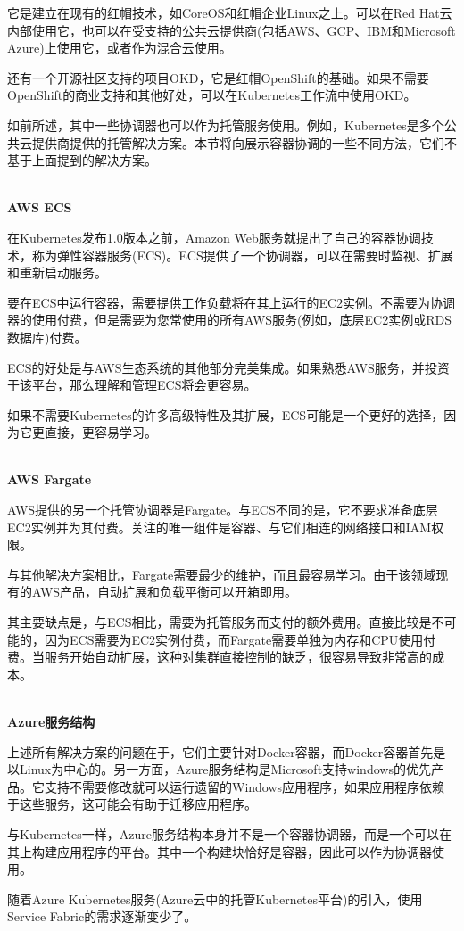 它是建立在现有的红帽技术，如CoreOS和红帽企业Linux之上。可以在Red Hat云内部使用它，也可以在受支持的公共云提供商(包括AWS、GCP、IBM和Microsoft Azure)上使用它，或者作为混合云使用。

还有一个开源社区支持的项目OKD，它是红帽OpenShift的基础。如果不需要OpenShift的商业支持和其他好处，可以在Kubernetes工作流中使用OKD。


如前所述，其中一些协调器也可以作为托管服务使用。例如，Kubernetes是多个公共云提供商提供的托管解决方案。本节将向展示容器协调的一些不同方法，它们不基于上面提到的解决方案。

\hspace*{\fill} \\ %
\noindent
\textbf{AWS ECS}

在Kubernetes发布1.0版本之前，Amazon Web服务就提出了自己的容器协调技术，称为弹性容器服务(ECS)。ECS提供了一个协调器，可以在需要时监视、扩展和重新启动服务。

要在ECS中运行容器，需要提供工作负载将在其上运行的EC2实例。不需要为协调器的使用付费，但是需要为您常使用的所有AWS服务(例如，底层EC2实例或RDS数据库)付费。

ECS的好处是与AWS生态系统的其他部分完美集成。如果熟悉AWS服务，并投资于该平台，那么理解和管理ECS将会更容易。

如果不需要Kubernetes的许多高级特性及其扩展，ECS可能是一个更好的选择，因为它更直接，更容易学习。

\hspace*{\fill} \\ %
\noindent
\textbf{AWS Fargate}

AWS提供的另一个托管协调器是Fargate。与ECS不同的是，它不要求准备底层EC2实例并为其付费。关注的唯一组件是容器、与它们相连的网络接口和IAM权限。

与其他解决方案相比，Fargate需要最少的维护，而且最容易学习。由于该领域现有的AWS产品，自动扩展和负载平衡可以开箱即用。

其主要缺点是，与ECS相比，需要为托管服务而支付的额外费用。直接比较是不可能的，因为ECS需要为EC2实例付费，而Fargate需要单独为内存和CPU使用付费。当服务开始自动扩展，这种对集群直接控制的缺乏，很容易导致非常高的成本。

\hspace*{\fill} \\ %
\noindent
\textbf{Azure服务结构}

上述所有解决方案的问题在于，它们主要针对Docker容器，而Docker容器首先是以Linux为中心的。另一方面，Azure服务结构是Microsoft支持windows的优先产品。它支持不需要修改就可以运行遗留的Windows应用程序，如果应用程序依赖于这些服务，这可能会有助于迁移应用程序。

与Kubernetes一样，Azure服务结构本身并不是一个容器协调器，而是一个可以在其上构建应用程序的平台。其中一个构建块恰好是容器，因此可以作为协调器使用。

随着Azure Kubernetes服务(Azure云中的托管Kubernetes平台)的引入，使用Service Fabric的需求逐渐变少了。









